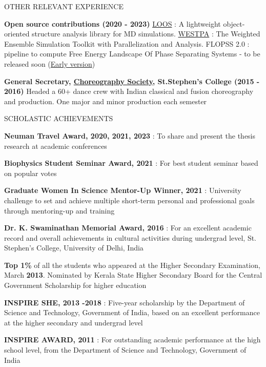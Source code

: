 \documentclass{resume} %
\begin{document}
\begin{rSection}{OTHER RELEVANT EXPERIENCE}
{   }
   \item \textbf{Open source contributions (2020 - 2023)} {\href{https://github.com/GrossfieldLab/loos}{LOOS} : A lightweight object-oriented structure analysis library for MD simulations.
      \href{https://github.com/westpa/westpa}{WESTPA} : The Weighted Ensemble Simulation Toolkit with Parallelization and Analysis}. FLOPSS 2.0 : pipeline to compute Free Energy Landscape Of Phase Separating Systems - to be released soon (\href{https://github.com/Poruthoor/Phase_Separation_Article/tree/main/FLOPSS}{Early version})
   \item \textbf{General Secretary, \href{https://www.ststephens.edu/choreography-society/}{Choreography Society}, St.Stephen's College (2015 - 2016)} {Headed a 60+ dance crew with Indian classical and fusion choreography and production. One major and minor production each semester }
\end{rSection}

\begin{rSection}{SCHOLASTIC ACHIEVEMENTS}
   \vspace{-1.25em}
   \item \textbf{Neuman Travel Award, 2020, 2021, 2023} : To share and present the thesis research at academic conferences
   \item \textbf{Biophysics Student Seminar Award, 2021} : For best student seminar based on popular votes
   \item \textbf{Graduate Women In Science Mentor-Up Winner, 2021} : University challenge to set and achieve multiple short-term personal and professional goals through mentoring-up and training
   \item \textbf{Dr. K. Swaminathan Memorial Award, 2016} : For an excellent academic record and overall achievements in cultural activities during undergrad level, St. Stephen's College, University of Delhi, India
   \item \textbf{Top 1\%} of all the students who appeared at the Higher Secondary Examination, March \textbf{2013}. Nominated by Kerala State Higher Secondary Board for the Central Government Scholarship for higher education
   \item \textbf{INSPIRE SHE, 2013 -2018} : Five-year scholarship by the Department of Science and Technology, Government of India, based on an excellent performance at the higher secondary and undergrad level
   \item \textbf{INSPIRE AWARD, 2011} : For outstanding academic performance at the high school level, from the Department of Science and Technology, Government of India


\end{rSection}
\end{document}
